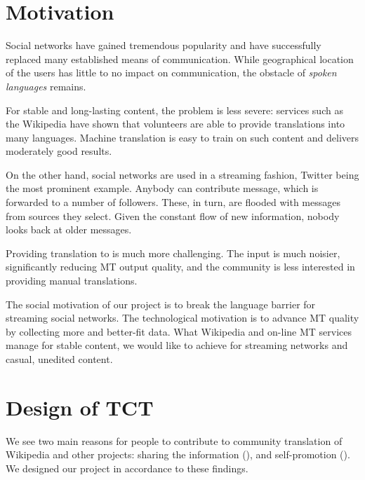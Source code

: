 \documentclass[11pt]{article}
\begin{document}
\section{Motivation}
\label{motiv}

Social networks have gained tremendous popularity and 
have successfully replaced many established means of communication. 
While geographical location of the users has little to no impact on 
communication, the obstacle of \emph{spoken languages} remains.

For stable and long-lasting content, the problem is less severe:
services such as the Wikipedia have shown that
volunteers are able to provide translations into many languages. 
Machine translation is easy to train on such
content and delivers moderately good results.

On the other hand, social networks are used in a streaming fashion, Twitter
being the most prominent example. Anybody can contribute message, 
which is forwarded to a number of followers. These, in turn, are flooded 
with messages from sources they select. Given the constant flow
of new information, nobody looks back at older messages.

Providing translation to  is much more challenging.
The input is much noisier, significantly reducing MT output quality, and the
community is less interested in providing manual translations.

The social motivation of our project is to break the language
barrier for streaming social networks. The technological motivation is to
advance MT quality by collecting more and better-fit data.
What Wikipedia and on-line MT services manage for stable content,
we would like to achieve for streaming networks and casual, unedited content.

\section{Design of TCT}
\label{design}

We see two main reasons for people to 
contribute to community translation of Wikipedia and other projects: sharing the information 
(), 
and self-promotion
().
We designed our project in accordance to these findings.
\end{document}
